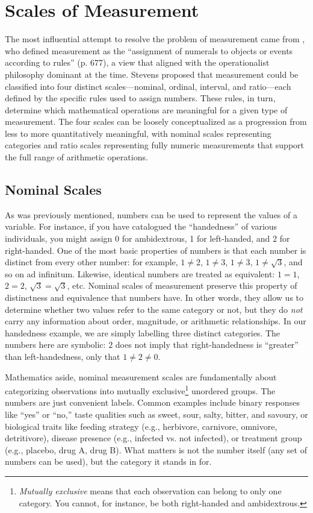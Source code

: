 \section{Scales of Measurement}

The most influential attempt to resolve the problem of measurement came from \textcite{Stevens1946}, who defined measurement as the ``assignment of numerals to objects or events according to rules'' (p. 677), a view that aligned with the operationalist philosophy dominant at the time. Stevens proposed that measurement could be classified into four distinct scales—nominal, ordinal, interval, and ratio—each defined by the specific rules used to assign numbers. These rules, in turn, determine which mathematical operations are meaningful for a given type of measurement. The four scales can be loosely conceptualized as a progression from less to more quantitatively meaningful, with nominal scales representing categories and ratio scales representing fully numeric measurements that support the full range of arithmetic operations.

\subsection{Nominal Scales}
\label{sec:nominal}

As was previously mentioned, numbers can be used to represent the values of a variable. For instance, if you have catalogued the ``handedness'' of various individuals, you might assign 0 for ambidextrous, 1 for left-handed, and 2 for right-handed. One of the most basic properties of numbers is that each number is distinct from every other number: for example, $1 \neq 2$, $1 \neq 3$, $1 \neq 3$, $1 \neq \sqrt{3}$, and so on ad infinitum. Likewise, identical numbers are treated as equivalent: $1 = 1$, $2 = 2$, $\sqrt{3} = \sqrt{3}$, etc. Nominal scales of measurement preserve this property of distinctness and equivalence that numbers have. In other words, they allow us to determine whether two values refer to the same category or not, but they do \textit{not} carry any information about order, magnitude, or arithmetic relationships. In our handedness example, we are simply labelling three distinct categories. The numbers here are symbolic: $2$ does not imply that right-handedness is ``greater'' than left-handedness, only that $1 \neq 2 \neq 0$.

Mathematics aside, nominal measurement scales are fundamentally about categorizing observations into mutually exclusive\footnote{\textit{Mutually exclusive} means that each observation can belong to only one category. You cannot, for instance, be both right-handed and ambidextrous.} unordered groups. The numbers are just convenient labels. Common examples include binary responses like ``yes'' or ``no,'' taste qualities such as sweet, sour, salty, bitter, and savoury, or biological traits like feeding strategy (e.g., herbivore, carnivore, omnivore, detritivore), disease presence (e.g., infected vs. not infected), or treatment group (e.g., placebo, drug A, drug B). What matters is not the number itself (any set of numbers can be used), but the category it stands in for. 

